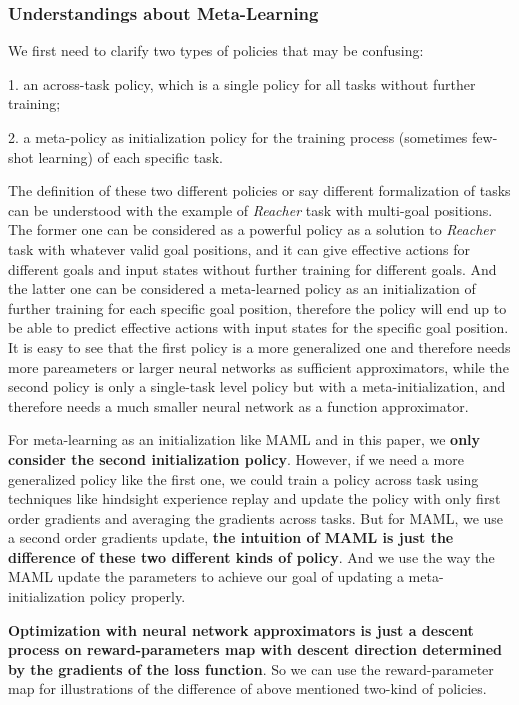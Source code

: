 \documentclass{article}
\begin{document}
\subsubsection{Understandings about Meta-Learning}
We first need to clarify two types of policies that may be confusing: 

1. an across-task policy, which is a single policy for all tasks without further training; 

2. a meta-policy as initialization policy for the training process (sometimes few-shot learning) of each specific task. 

The definition of these two different policies or say different formalization of tasks can be understood with the example of \textit{Reacher} task with multi-goal positions. The former one can be considered as a powerful policy as a solution to \textit{Reacher} task with whatever valid goal positions, and it can give effective actions for different goals and input states without further training for different goals. And the latter one can be considered a meta-learned policy as an initialization of further training for each specific goal position, therefore the policy will end up to be able to predict effective actions with input states for the specific goal position. It is easy to see that the first policy is a more generalized one and therefore needs more pareameters or larger neural networks as sufficient approximators, while the second policy is only a single-task level policy but with a meta-initialization, and therefore needs a much smaller neural network as a function approximator.

For meta-learning as an initialization like MAML and in this paper, we \textbf{only consider the second initialization policy}. However, if we need a more generalized policy like the first one, we could train a policy across task using techniques like hindsight experience replay and update the policy with only first order gradients and averaging the gradients across tasks. But for MAML, we use a second order gradients update, \textbf{the intuition of MAML is just the difference of these two different kinds of policy}. And we use the way the MAML update the parameters to achieve our goal of updating a meta-initialization policy properly.

\textbf{Optimization with neural network approximators is just a descent process on reward-parameters map with descent direction determined by the gradients of the loss function}. So we can use the reward-parameter map for illustrations of the difference of above mentioned two-kind of policies.
\end{document}
